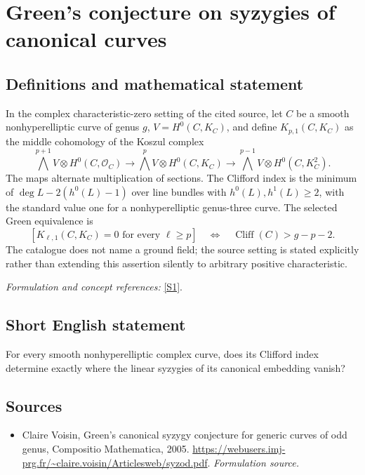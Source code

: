 \documentclass[11pt]{article}
\begin{document}
\section*{\texorpdfstring{Green's conjecture on syzygies of canonical curves}{Green's conjecture on syzygies of canonical curves}}\label{385}
\subsection{Definitions and mathematical statement}
In the complex characteristic-zero setting of the cited source, let $C$ be a smooth nonhyperelliptic curve of genus $g$, $V=H^0(C,K_C)$, and define $K_{p,1}(C,K_C)$ as the middle cohomology of the Koszul complex
\[
 \bigwedge^{p+1}V\otimes H^0(C,\mathcal O_C)
 \longrightarrow\bigwedge^pV\otimes H^0(C,K_C)
 \longrightarrow\bigwedge^{p-1}V\otimes H^0(C,K_C^2).
\]
The maps alternate multiplication of sections. The Clifford index is the minimum of $\deg L-2(h^0(L)-1)$ over line bundles with $h^0(L),h^1(L)\ge2$, with the standard value one for a nonhyperelliptic genus-three curve. The selected Green equivalence is
\[
 [K_{\ell,1}(C,K_C)=0\text{ for every }\ell\ge p]
 \quad\Longleftrightarrow\quad\operatorname{Cliff}(C)>g-p-2.
\]
The catalogue does not name a ground field; the source setting is stated explicitly rather than extending this assertion silently to arbitrary positive characteristic.
\par\smallskip\textit{Formulation and concept references:} \href{https://webusers.imj-prg.fr/~claire.voisin/Articlesweb/syzod.pdf}{[S1]}.

\subsection{Short English statement}
For every smooth nonhyperelliptic complex curve, does its Clifford index determine exactly where the linear syzygies of its canonical embedding vanish?
\subsection{Sources}
\begin{itemize}
\item[S1]Claire Voisin, Green's canonical syzygy conjecture for generic curves of odd genus, Compositio Mathematica, 2005.
\url{https://webusers.imj-prg.fr/~claire.voisin/Articlesweb/syzod.pdf}.
\textit{Formulation source.}
\end{itemize}
\end{document}
